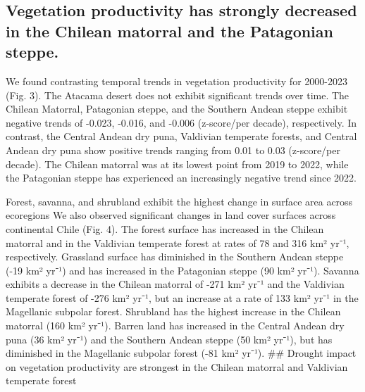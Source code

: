 \documentclass[
  sn-nature,
  numbered]{sn-jnl}
\begin{document}
\subsection{Vegetation productivity has strongly decreased in the
Chilean matorral and the Patagonian
steppe.}\label{vegetation-productivity-has-strongly-decreased-in-the-chilean-matorral-and-the-patagonian-steppe.}

We found contrasting temporal trends in vegetation productivity for
2000-2023 (Fig. 3). The Atacama desert does not exhibit significant
trends over time. The Chilean Matorral, Patagonian steppe, and the
Southern Andean steppe exhibit negative trends of -0.023, -0.016, and
-0.006 (z-score/per decade), respectively. In contrast, the Central
Andean dry puna, Valdivian temperate forests, and Central Andean dry
puna show positive trends ranging from 0.01 to 0.03 (z-score/per
decade). The Chilean matorral was at its lowest point from 2019 to 2022,
while the Patagonian steppe has experienced an increasingly negative
trend since 2022.

Forest, savanna, and shrubland exhibit the highest change in surface
area across ecoregions We also observed significant changes in land
cover surfaces across continental Chile (Fig. 4). The forest surface has
increased in the Chilean matorral and in the Valdivian temperate forest
at rates of 78 and 316 km² yr⁻¹, respectively. Grassland surface has
diminished in the Southern Andean steppe (-19 km² yr⁻¹) and has
increased in the Patagonian steppe (90 km² yr⁻¹). Savanna exhibits a
decrease in the Chilean matorral of -271 km² yr⁻¹ and the Valdivian
temperate forest of -276 km² yr⁻¹, but an increase at a rate of 133 km²
yr⁻¹ in the Magellanic subpolar forest. Shrubland has the highest
increase in the Chilean matorral (160 km² yr⁻¹). Barren land has
increased in the Central Andean dry puna (36 km² yr⁻¹) and the Southern
Andean steppe (50 km² yr⁻¹), but has diminished in the Magellanic
subpolar forest (-81 km² yr⁻¹). \#\# Drought impact on vegetation
productivity are strongest in the Chilean matorral and Valdivian
temperate forest
\end{document}
